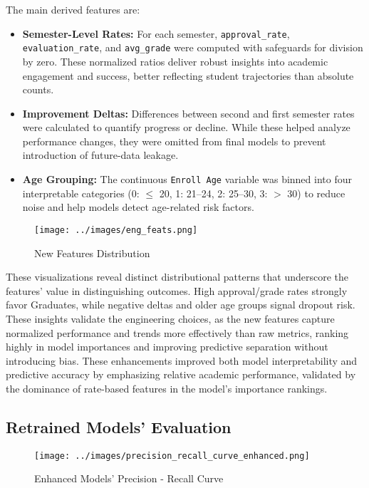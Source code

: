 \documentclass[twoside,final]{hcmut-report}
\begin{document}
The main derived features are:
\begin{itemize}
  \item \textbf{Semester-Level Rates:} For each semester, \texttt{approval\_rate}, \texttt{evaluation\_rate}, and \texttt{avg\_grade} were computed with safeguards for division by zero. These normalized ratios deliver robust insights into academic engagement and success, better reflecting student trajectories than absolute counts.
  \item \textbf{Improvement Deltas:} Differences between second and first semester rates were calculated to quantify progress or decline. While these helped analyze performance changes, they were omitted from final models to prevent introduction of future-data leakage.
  \item \textbf{Age Grouping:} The continuous \texttt{Enroll Age} variable was binned into four interpretable categories (0: $\leq$ 20, 1: 21--24, 2: 25--30, 3: $>$ 30) to reduce noise and help models detect age-related risk factors.
\end{itemize}
\begin{figure}[H]
  \centering
  \texttt{[image: ../images/eng\_feats.png]}
  \caption{New Features Distribution}
  \label{eng_feats}
\end{figure}

These visualizations reveal distinct distributional patterns that underscore the features' value in distinguishing outcomes. High approval/grade rates strongly favor Graduates, while negative deltas and older age groups signal dropout risk. These insights validate the engineering choices, as the new features capture normalized performance and trends more effectively than raw metrics, ranking highly in model importances and improving predictive separation without introducing bias. These enhancements improved both model interpretability and predictive accuracy by emphasizing relative academic performance, validated by the dominance of rate-based features in the model's importance rankings.
\subsection{Retrained Models' Evaluation}
\begin{figure}[H]
  \centering
  \texttt{[image: ../images/precision\_recall\_curve\_enhanced.png]}
  \caption{Enhanced Models' Precision - Recall Curve}
  \label{pr_curve_enhanced}
\end{figure}
\end{document}

